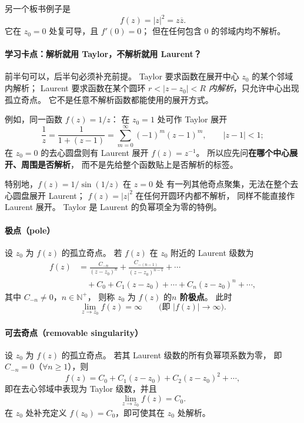 另一个板书例子是
\[
  f(z)=|z|^2=z\overline z.
\]
它在 $z_0=0$ 处复可导，且 $f'(0)=0$；
但在任何包含 $0$ 的邻域内均不解析。


\paragraph{学习卡点：解析就用 Taylor，不解析就用 Laurent？}
前半句可以，后半句必须补充前提。
Taylor 要求函数在展开中心 $z_0$ 的某个邻域内解析；
Laurent 要求函数在某个圆环
$r<|z-z_0|<R$ \emph{内解析}，只允许中心出现孤立奇点。
它不是任意不解析函数都能使用的展开方式。

例如，同一函数 $f(z)=1/z$：
在 $z_0=1$ 处可作 Taylor 展开
\[
 \frac1z=\frac1{1+(z-1)}
 =\sum_{m=0}^{\infty}(-1)^m(z-1)^m,\qquad |z-1|<1;
\]
在 $z_0=0$ 的去心圆盘则有 Laurent 展开
$f(z)=z^{-1}$。
所以应先问\textbf{在哪个中心展开、周围是否解析}，
而不是先给整个函数贴上是否解析的标签。

特别地，$f(z)=1/\sin(1/z)$ 在 $z=0$ 处
有一列其他奇点聚集，无法在整个去心圆盘展开 Laurent；
$f(z)=|z|^2$ 在任何开圆环内都不解析，
同样不能直接作 Laurent 展开。
Taylor 是 Laurent 的负幂项全为零的特例。


\paragraph{极点（pole）}
设 $z_0$ 为 $f(z)$ 的孤立奇点。
若 $f(z)$ 在 $z_0$ 附近的 Laurent 级数为
\begin{align*}
  f(z)
  &=\frac{C_{-n}}{(z-z_0)^n}
   +\frac{C_{-(n-1)}}{(z-z_0)^{n-1}}
   +\cdots\\
  &\quad +C_0+C_1(z-z_0)+\cdots+C_n(z-z_0)^n+\cdots,
\end{align*}
其中 $C_{-n}\ne0$，$n\in\mathbb N^+$，
则称 $z_0$ 为 $f(z)$ 的\textbf{$n$ 阶极点}。
此时
\[
  \lim_{z\to z_0}f(z)=\infty
  \qquad\bigl(\text{即 }|f(z)|\to\infty\bigr).
\]

\paragraph{可去奇点（removable singularity）}
设 $z_0$ 为 $f(z)$ 的孤立奇点。
若其 Laurent 级数的所有负幂项系数为零，
即 $C_{-n}=0$（$\forall n\ge1$），则
\[
  f(z)=C_0+C_1(z-z_0)+C_2(z-z_0)^2+\cdots,
\]
即在去心邻域中表现为 Taylor 级数，并且
\[
  \lim_{z\to z_0}f(z)=C_0.
\]
在 $z_0$ 处补充定义 $f(z_0)=C_0$，即可使其在 $z_0$ 处解析。


